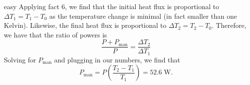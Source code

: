 \begin{solution}{easy}
Applying fact 6, we find that the initial heat flux is proportional to $\Delta T_1 = T_1 - T_0$ as the temperature change is minimal (in fact smaller than one Kelvin). Likewise, the final heat flux is proportional to $\Delta T_2 = T_2 - T_0$. Therefore, we have that the ratio of powers is \[\frac {P + P_{\text{man}}}{P} = \frac {\Delta T_2}{\Delta T_1}\]
Solving for $P_{\text{man}}$ and plugging in our numbers, we find that \[P_{\text{man}}= P\left(\frac {T_2-T_1}{T_1}\right) = \boxed{52.6\;\mathrm{W}}.\]
\end{solution}